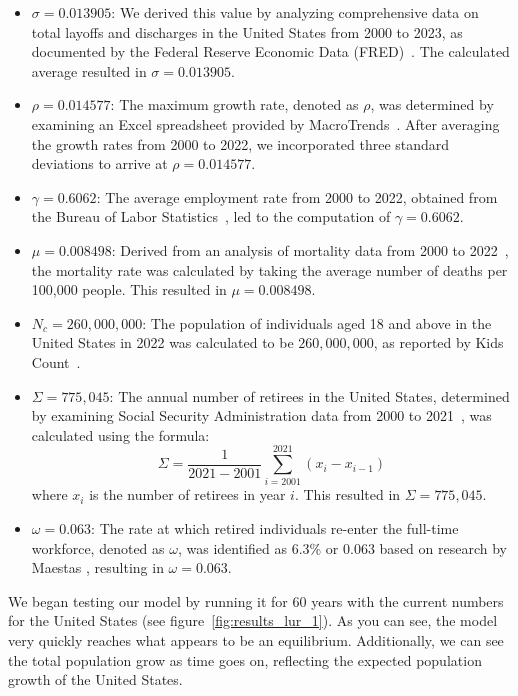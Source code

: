 \documentclass[11pt]{amsart}
\begin{document}
\begin{itemize}
    \item $\sigma = 0.013905$: We derived this value by analyzing comprehensive data on total layoffs and discharges in the United States from 2000 to 2023, as documented by the Federal Reserve Economic Data (FRED)~\cite{FRED}. The calculated average resulted in $\sigma = 0.013905$.
    \item $\rho = 0.014577$: The maximum growth rate, denoted as $\rho$, was determined by examining an Excel spreadsheet provided by MacroTrends~\cite{MacroTrends}. After averaging the growth rates from 2000 to 2022, we incorporated three standard deviations to arrive at $\rho = 0.014577$.
    \item $\gamma = 0.6062$: The average employment rate from 2000 to 2022, obtained from the Bureau of Labor Statistics~\cite{BLS}, led to the computation of $\gamma = 0.6062$.
    \item $\mu = 0.008498$: Derived from an analysis of mortality data from 2000 to 2022~\cite{usafacts}, the mortality rate was calculated by taking the average number of deaths per 100,000 people. This resulted in $\mu = 0.008498$.
    \item $N_c = 260,000,000$: The population of individuals aged 18 and above in the United States in 2022 was calculated to be $260,000,000$, as reported by Kids Count~\cite{kidscount}.
    \item $\Sigma = 775,045$: The annual number of retirees in the United States, determined by examining Social Security Administration data from 2000 to 2021~\cite{ssa}, was calculated using the formula:
    \[
        \Sigma = \frac{1}{2021 - 2001}\sum_{i=2001}^{2021}(x_i - x_{i-1})
    \]
    where $x_i$ is the number of retirees in year $i$. This resulted in $\Sigma = 775,045$.
    \item $\omega = 0.063$: The rate at which retired individuals re-enter the full-time workforce, denoted as $\omega$, was identified as 6.3\% or $0.063$ based on research by Maestas \cite{maestas}, resulting in $\omega = 0.063$.
\end{itemize}

We began testing our model by running it for 60 years with the current numbers for the United States (see figure~\ref{fig:results_lur_1}). As you can see,
the model very quickly reaches what appears to be an equilibrium. Additionally, we can see the total population grow as time goes on, reflecting the expected population growth of the United States.
\end{document}

